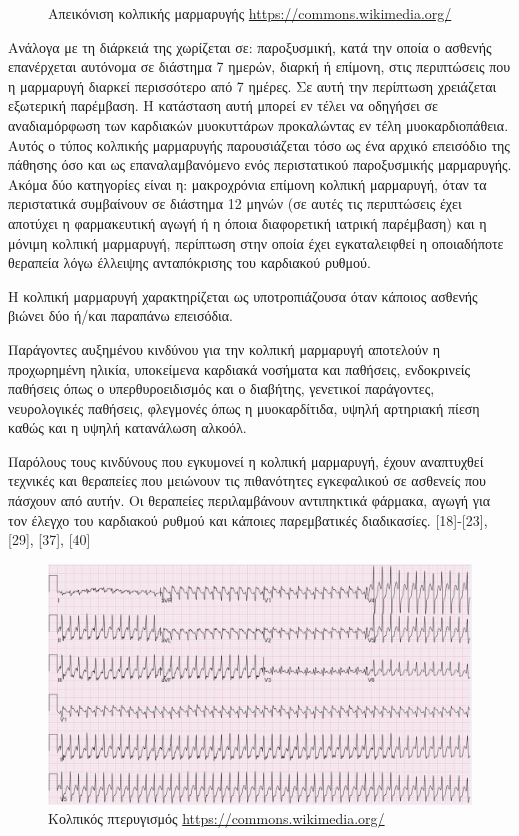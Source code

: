 \begin{itemize}
\begin{figure}[h]
		\caption{Απεικόνιση κολπικής μαρμαρυγής \en \protect\url{https://commons.wikimedia.org/}}
	\end{figure}
	Ανάλογα με τη διάρκειά της χωρίζεται σε: παροξυσμική, κατά την οποία ο ασθενής επανέρχεται αυτόνομα σε διάστημα 7 ημερών, διαρκή ή επίμονη, στις περιπτώσεις που η μαρμαρυγή διαρκεί περισσότερο από 7 ημέρες. Σε αυτή την περίπτωση χρειάζεται εξωτερική παρέμβαση. Η κατάσταση αυτή μπορεί εν τέλει να οδηγήσει σε αναδιαμόρφωση των καρδιακών μυοκυττάρων προκαλώντας εν τέλη μυοκαρδιοπάθεια. Αυτός ο τύπος κολπικής μαρμαρυγής παρουσιάζεται τόσο ως ένα αρχικό επεισόδιο της πάθησης όσο και ως επαναλαμβανόμενο ενός περιστατικού παροξυσμικής μαρμαρυγής. Ακόμα δύο κατηγορίες είναι η: μακροχρόνια επίμονη κολπική μαρμαρυγή, όταν τα περιστατικά συμβαίνουν σε διάστημα 12 μηνών (σε αυτές τις περιπτώσεις έχει αποτύχει η φαρμακευτική αγωγή ή η όποια διαφορετική ιατρική παρέμβαση) και η μόνιμη κολπική μαρμαρυγή, περίπτωση στην οποία έχει εγκαταλειφθεί η οποιαδήποτε θεραπεία λόγω έλλειψης ανταπόκρισης του καρδιακού ρυθμού. 
	\par
	Η κολπική μαρμαρυγή χαρακτηρίζεται ως υποτροπιάζουσα όταν κάποιος ασθενής βιώνει δύο ή/και παραπάνω επεισόδια.
	\par 
	Παράγοντες αυξημένου κινδύνου για την κολπική μαρμαρυγή αποτελούν η προχωρημένη ηλικία, υποκείμενα καρδιακά νοσήματα και παθήσεις, ενδοκρινείς παθήσεις όπως ο υπερθυροειδισμός και ο διαβήτης, γενετικοί παράγοντες, νευρολογικές παθήσεις, φλεγμονές όπως η μυοκαρδίτιδα, υψηλή αρτηριακή πίεση καθώς και η υψηλή κατανάλωση αλκοόλ.
	\par
	Παρόλους τους κινδύνους που εγκυμονεί η κολπική μαρμαρυγή, έχουν αναπτυχθεί τεχνικές και θεραπείες που μειώνουν τις πιθανότητες εγκεφαλικού σε ασθενείς που πάσχουν από αυτήν. 
	Οι θεραπείες περιλαμβάνουν αντιπηκτικά φάρμακα, αγωγή για τον έλεγχο του καρδιακού ρυθμού και κάποιες παρεμβατικές διαδικασίες. [18]-[23], [29], [37], [40] 
	\begin{figure}[h]
		\centering
		\includegraphics[scale=0.2]{Atrial_Flutter.jpg}
		\caption{Κολπικός πτερυγισμός \en\protect\url{https://commons.wikimedia.org/}}
	\end{figure}
	

\end{itemize}
